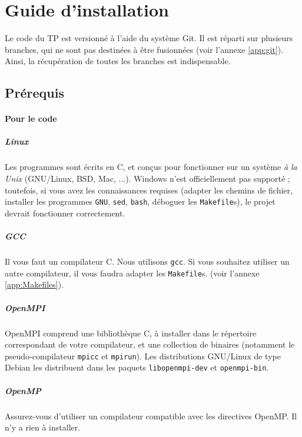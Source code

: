 \chapter{Guide d'installation}
\label{app:install}

Le code du TP est versionné à l'aide du système Git. Il est réparti
sur plusieurs branches, qui ne sont pas destinées à être fusionnées
(voir l'annexe \ref{app:git}). Ainsi, la récupération de toutes les
branches est indispensable.

\section{Prérequis}

\subsubsection{Pour le code}

\paragraph{Linux}
Les programmes sont écrits en C, et conçus pour fonctionner sur un
système \emph{à la Unix} (GNU/Linux, BSD, Mac, ...). Windows n'est
officiellement pas supporté ; toutefois, si vous avez les
connaissances requises (adapter les chemins de fichier, installer
les programmes \texttt{GNU}, \texttt{sed}, \texttt{bash}, déboguer les
\texttt{Makefile}s), le projet devrait fonctionner correctement.

\paragraph{GCC}
Il vous faut un compilateur C. Nous utilisons \texttt{gcc}. Si vous
souhaitez utiliser un autre compilateur, il vous faudra adapter les
\texttt{Makefile}s. (voir l'annexe \ref{app:Makefiles}).

\paragraph{OpenMPI}
OpenMPI comprend une bibliothèque C, à installer dans le répertoire
correspondant de votre compilateur, et une collection de binaires
(notamment le pseudo-compilateur \texttt{mpicc} et
\texttt{mpirun}). Les distributions GNU/Linux de type Debian les
distribuent dans les paquets \texttt{libopenmpi-dev} et
\texttt{openmpi-bin}.

\paragraph{OpenMP}
Assurez-vous d'utiliser un com\-pi\-la\-teur compatible avec les
directives OpenMP. Il n'y a rien à installer.


